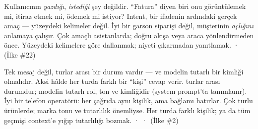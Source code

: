 
 Kullanıcının \emph{yazdığı}, \emph{istediği} şey değildir.
``Fatura'' diyen biri onu görüntülemek mi, itiraz etmek mi, ödemek mi istiyor?
 Intent, bir ifadenin ardındaki gerçek amaç --- yüzeydeki kelimeler değil.
 İyi bir garson siparişi değil, müşterinin \emph{açlığını} anlamaya çalışır.
 Çok amaçlı asistanlarda; doğru akışa veya araca yönlendirmeden önce.
 Yüzeydeki kelimelere göre dallanmak; niyeti çıkarmadan yanıtlamak.
  ·  \,{\scriptsize\color{softgray}(İlke \#22)}

 Tek mesaj değil, turlar arası bir durum vardır --- ve modelin tutarlı
bir kimliği olmalıdır. Aksi hâlde her turda farklı bir ``kişi'' cevap verir.
  turlar arası durumdur;  modelin
tutarlı rol, ton ve kimliğidir (system prompt'ta tanımlanır).
 İyi bir telefon operatörü: her çağrıda aynı kişilik, ama bağlamı hatırlar.
 Çok turlu ürünlerde; marka tonu ve tutarlılık önemliyse.
 Her turda farklı kişilik; ya da tüm geçmişi context'e yığıp tutarlılığı bozmak.
  ·  ·  \,{\scriptsize\color{softgray}(İlke \#2)}
